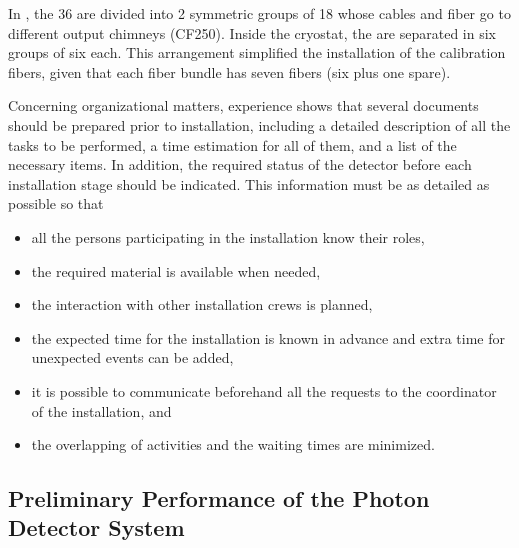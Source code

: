 In , the \num{36}  are divided into \num{2} symmetric groups of 18 whose cables and fiber go to different output chimneys (CF250). Inside the cryostat, the  are separated in six groups of six each. This arrangement simplified the installation of the calibration fibers, given that each fiber bundle has seven fibers (six plus one spare). 

Concerning organizational matters,  experience shows that several documents should be prepared prior to installation, including a detailed description of all the tasks to be performed, a time estimation for all of them, and a list of the necessary items. In addition, the required status of the detector before each installation stage should be indicated. This information must be as detailed as possible so that %

\begin{itemize}
\item all the persons participating in the  installation know their roles,
\item the required material is %
available when needed,
\item the interaction with other installation crews is planned,
\item the expected time for the installation is known in advance and extra time for unexpected events can be added,
\item it is possible to communicate beforehand all the requests to the coordinator of the installation, and
\item the overlapping of activities and the waiting times are minimized. 
\end{itemize}



\subsection{Preliminary Performance of the  Photon Detector System}

